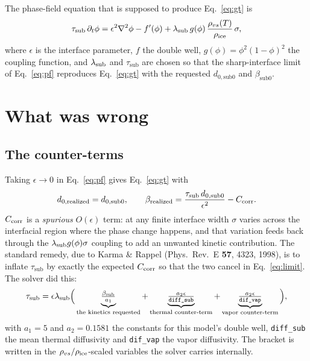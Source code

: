 \documentclass[11pt,a4paper]{article}
\newcommand{\code}[1]{\texttt{\small #1}}
\newcommand{\bsub}{\beta_{\mathrm{sub0}}}
\newcommand{\dsub}{d_{0,\mathrm{sub0}}}
\newcommand{\tsub}{\tau_{\mathrm{sub}}}
\begin{document}
The phase-field equation that is supposed to produce Eq.~\eqref{eq:gt} is
\begin{equation}
\tsub\,\partial_t\phi=\epsilon^2\nabla^2\phi-f'(\phi)
+\lambda_{\rm sub}\,g(\phi)\,\frac{\rho_{vs}(T)}{\rho_{\rm ice}}\,\sigma ,
\label{eq:pf}
\end{equation}
where $\epsilon$ is the interface parameter, $f$ the double well, $g(\phi)=\phi^2(1-\phi)^2$
the coupling function, and $\lambda_{\rm sub}$ and $\tsub$ are chosen so that the
sharp-interface limit of Eq.~\eqref{eq:pf} reproduces Eq.~\eqref{eq:gt} with the requested
$\dsub$ and $\bsub$.

\section{What was wrong}

\subsection{The counter-terms}
Taking $\epsilon\to0$ in Eq.~\eqref{eq:pf} gives Eq.~\eqref{eq:gt} with
\begin{equation}
d_{0,\rm realized}=\dsub,\qquad
\beta_{\rm realized}=\frac{\tsub\,\dsub}{\epsilon^{2}}-C_{\rm corr} .
\label{eq:limit}
\end{equation}
$C_{\rm corr}$ is a \emph{spurious} $O(\epsilon)$ term: at any finite interface width
$\sigma$ varies across the interfacial region where the phase change happens, and that
variation feeds back through the $\lambda_{\rm sub}g(\phi)\sigma$ coupling to add an
unwanted kinetic contribution. The standard remedy, due to Karma \& Rappel
(Phys.\ Rev.\ E \textbf{57}, 4323, 1998), is to inflate $\tsub$ by exactly the expected
$C_{\rm corr}$ so that the two cancel in Eq.~\eqref{eq:limit}. The solver did this:
\begin{equation}
\tsub=\epsilon\lambda_{\rm sub}\Big(
\underbrace{\tfrac{\beta_{\rm sub}}{a_1}}_{\text{the kinetics requested}}
+\underbrace{\tfrac{a_2\epsilon}{\texttt{diff\_sub}}}_{\text{thermal counter-term}}
+\underbrace{\tfrac{a_2\epsilon}{\texttt{dif\_vap}}}_{\text{vapor counter-term}}\Big),
\label{eq:tau}
\end{equation}
with $a_1=5$ and $a_2=0.1581$ the constants for this model's double well,
\code{diff\_sub} the mean thermal diffusivity and \code{dif\_vap} the vapor diffusivity.
The bracket is written in the $\rho_{vs}/\rho_{\rm ice}$-scaled variables the solver
carries internally.
\end{document}
